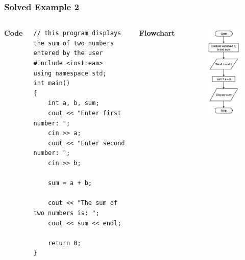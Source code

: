\documentclass{beamer}
\begin{document}
\begin{frame}[fragile]
    \frametitle{Solved Example 2}
    \begin{columns}
    \textbf{Code}
    \lstset{style=mystyle}
    \begin{lstlisting}
// this program displays the sum of two numbers entered by the user
#include <iostream>
using namespace std;
int main()
{
    int a, b, sum;
    cout << "Enter first number: ";
    cin >> a;
    cout << "Enter second number: ";
    cin >> b;

    sum = a + b;

    cout << "The sum of two numbers is: ";
    cout << sum << endl;

    return 0;
}\end{lstlisting}
    \textbf{Flowchart}
    \begin{figure}
        \centering
        \includegraphics[scale=0.55]{p2flow}
    \end{figure}
    \end{columns}
\end{frame}
\end{document}
